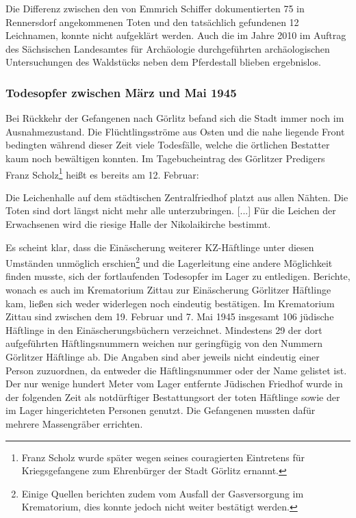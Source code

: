 \documentclass[a4paper,12pt,ngerman,
]{nisebook}
\begin{document}
Die Differenz zwischen den von Emmrich Schiffer dokumentierten 75 in Rennersdorf angekommenen Toten und den tatsächlich gefundenen 12 Leichnamen, konnte nicht aufgeklärt werden. Auch die im Jahre 2010 im Auftrag des Sächsischen Landesamtes für Archäologie durchgeführten archäologischen Untersuchungen des Waldstücks neben dem Pferdestall blieben ergebnislos.

\subsubsection{Todesopfer zwischen März und Mai 1945}

Bei Rückkehr der Gefangenen nach Görlitz befand sich die Stadt immer noch im Ausnahmezustand. Die Flüchtlingsströme aus Osten und die nahe liegende Front bedingten während dieser Zeit viele Todesfälle, welche die örtlichen Bestatter kaum noch bewältigen konnten. 
Im Tagebucheintrag des Görlitzer Predigers Franz Scholz\footnote{Franz Scholz wurde später wegen seines couragierten Eintretens für Kriegsgefangene zum Ehrenbürger der Stadt Görlitz ernannt.} heißt es bereits am 12. Februar:
\begin{leftbar}
Die Leichenhalle auf dem städtischen Zentralfriedhof platzt aus allen Nähten. Die Toten sind dort längst nicht mehr alle unterzubringen. [...] Für die Leichen der Erwachsenen wird die riesige Halle der Nikolaikirche bestimmt.
\end{leftbar}
\newpage
Es scheint klar, dass die Einäscherung weiterer KZ-Häftlinge unter diesen Umständen unmöglich erschien\footnote{Einige Quellen berichten zudem vom Ausfall der Gasversorgung im Krematorium, dies konnte jedoch nicht weiter bestätigt werden.} und die Lagerleitung eine andere Möglichkeit finden musste, sich der fortlaufenden Todesopfer im Lager zu entledigen.
\newline
Berichte, wonach es auch im Krematorium Zittau zur Einäscherung Görlitzer Häftlinge kam, ließen sich weder widerlegen noch eindeutig bestätigen. Im Krematorium Zittau sind zwischen dem 19. Februar und 7. Mai 1945 insgesamt 106 jüdische Häftlinge in den Einäscherungsbüchern verzeichnet. Mindestens 29 der dort aufgeführten Häftlingsnummern weichen nur geringfügig von den Nummern Görlitzer Häftlinge ab. Die Angaben sind aber jeweils nicht eindeutig einer Person zuzuordnen, da entweder die Häftlingsnummer oder der Name gelistet ist.
\newline
Der nur wenige hundert Meter vom Lager entfernte Jüdischen Friedhof wurde in der folgenden Zeit als notdürftiger Bestattungsort der toten Häftlinge sowie der im Lager hingerichteten Personen genutzt. Die Gefangenen mussten dafür mehrere Massengräber errichten. 
\end{document}
